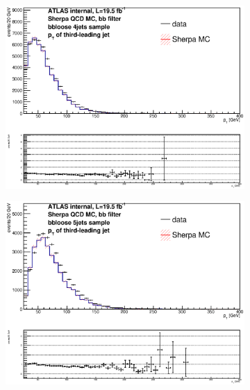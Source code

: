 \begin{figure}[phtb!]
\begin{center}
  \begin{subfigure}[$bbloose$ 4 jet category]{0.3\textwidth}\includegraphics[width=\textwidth]{MonteCarlo/figures/pt2_bbloose_4jets.eps}\end{subfigure}
  \begin{subfigure}[$bbloose$ 5+ jet category]{0.3\textwidth}\includegraphics[width=\textwidth]{MonteCarlo/figures/pt2_bbloose_5jets.eps}\end{subfigure}

\end{center}
\end{figure}

